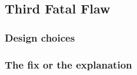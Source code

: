 \subsection{Third Fatal Flaw}

\subsubsection{Design choices}

\subsubsection{The fix or the explanation}